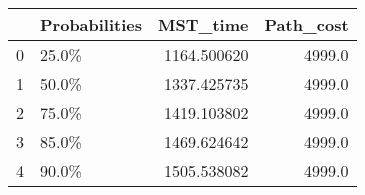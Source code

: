 \begin{tabular}{llrr}
\toprule
{} & Probabilities &     MST\_time &  Path\_cost \\
\midrule
0 &         25.0\% &  1164.500620 &     4999.0 \\
1 &         50.0\% &  1337.425735 &     4999.0 \\
2 &         75.0\% &  1419.103802 &     4999.0 \\
3 &         85.0\% &  1469.624642 &     4999.0 \\
4 &         90.0\% &  1505.538082 &     4999.0 \\
\bottomrule
\end{tabular}
